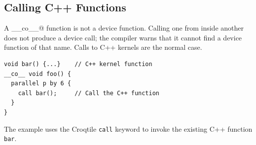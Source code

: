 \subsection*{Calling C++ Functions}

A \co@__co__@ function is not a device function. Calling one from inside another does not produce a device call; the compiler warns that it cannot find a device function of that name. Calls to C++ kernels are the normal case.

\begin{lstlisting}[language=croqtile,caption={Calling C++ Functions}]
void bar() {...}    // C++ kernel function
__co__ void foo() {
  parallel p by 6 {
    call bar();     // Call the C++ function
  }
}
\end{lstlisting}

The example uses the Croqtile \texttt{call} keyword to invoke the existing C++ function \texttt{bar}.
